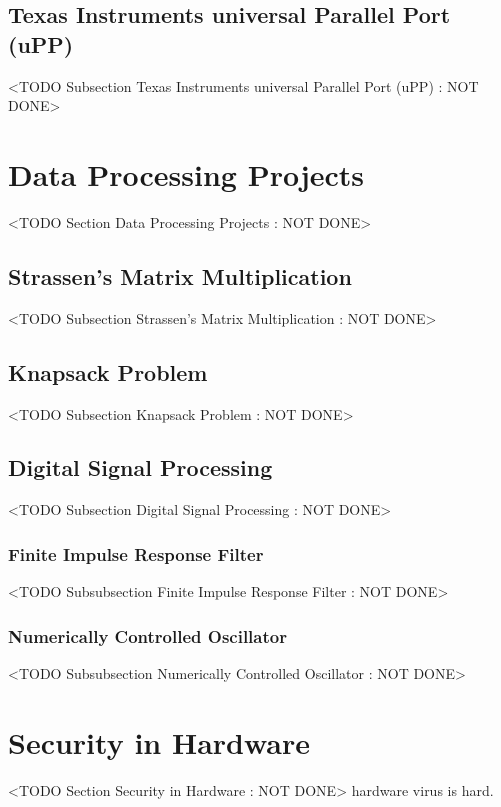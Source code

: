 \subsection{Texas Instruments universal Parallel Port (uPP)}
	<TODO Subsection Texas Instruments universal Parallel Port (uPP) : NOT DONE>

\section{Data Processing Projects}
	<TODO Section Data Processing Projects : NOT DONE>

\subsection{Strassen's Matrix Multiplication}
	<TODO Subsection Strassen's Matrix Multiplication : NOT DONE>

\subsection{Knapsack Problem}
	<TODO Subsection Knapsack Problem : NOT DONE>

\subsection{Digital Signal Processing}
	<TODO Subsection Digital Signal Processing : NOT DONE>

\subsubsection{Finite Impulse Response Filter}
	<TODO Subsubsection  Finite Impulse Response Filter : NOT DONE>

\subsubsection{Numerically Controlled Oscillator}
	<TODO Subsubsection  Numerically Controlled Oscillator : NOT DONE>

\section{Security in Hardware}
	<TODO Section Security in Hardware : NOT DONE>
hardware virus is hard. 
